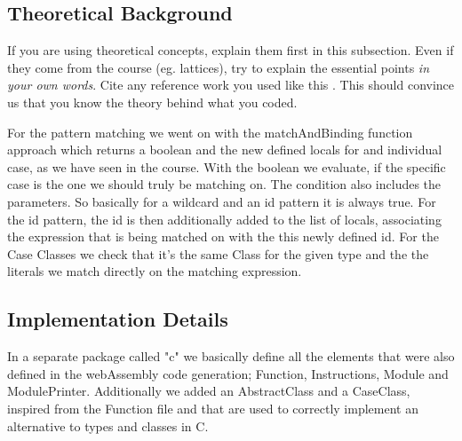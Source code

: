 
\subsection{Theoretical Background}
If you are using theoretical concepts, explain them first in this subsection.
Even if they come from the course (eg. lattices), try to explain the essential
points \emph{in your own words}. Cite any reference work you used like this
\cite{TigerBook}. This should convince us that you know the theory behind what
you coded.

For the pattern matching we went on with the matchAndBinding function approach which returns a boolean and the new defined locals for and individual case, as we have seen in the course.
With the boolean we evaluate, if the specific case is the one we should truly be matching on.
The condition also includes the parameters. So basically for a wildcard and an id pattern it is always true.
For the id pattern, the id is then additionally added to the list of locals, associating the expression that is being matched on with the this newly defined id.
For the Case Classes we check that it's the same Class for the given type and the the literals we match directly on the matching expression.

\subsection{Implementation Details}
%
In a separate package called "c" we basically define all the elements that were also defined in the webAssembly code generation; Function, Instructions, Module and ModulePrinter.
Additionally we added an AbstractClass and a CaseClass, inspired from the Function file and that are used to correctly implement an alternative to types and classes in C.

